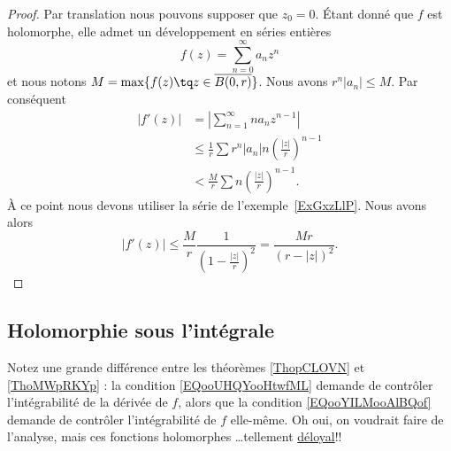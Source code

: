 \begin{proof}
	Par translation nous pouvons supposer que \( z_0=0\). Étant donné que \( f\) est holomorphe, elle admet un développement en séries entières
	\begin{equation}
		f(z)=\sum_{n=0}^{\infty}a_nz^n
	\end{equation}
	et nous notons \( M=\max\{ f(z)\tq z\in \overline{ B(0,r) } \}\). Nous avons \( r^n| a_n |\leq M\). Par conséquent
	\begin{subequations}
		\begin{align}
			| f'(z) | & =\left| \sum_{n=1}^{\infty}na_nz^{n-1} \right|                            \\
			          & \leq\frac{1}{ r }\sum r^n| a_n |n\left( \frac{ | z | }{ r } \right)^{n-1} \\
			          & <\frac{ M }{ r }\sum n\left( \frac{ | z | }{ r } \right)^{n-1}.
		\end{align}
	\end{subequations}
	À ce point nous devons utiliser la série de l'exemple~\ref{ExGxzLlP}. Nous avons alors
	\begin{equation}
		| f'(z) |\leq \frac{ M }{ r }\frac{ 1 }{ \left( 1-\frac{ | z | }{ r } \right)^2 }=\frac{ Mr }{ (r-| z |)^2 }.
	\end{equation}
\end{proof}

\subsection{Holomorphie sous l'intégrale}

\begin{normaltext}
	Notez une grande différence entre les théorèmes \ref{ThopCLOVN} et \ref{ThoMWpRKYp} : la condition \eqref{EQooUHQYooHtwfML} demande de contrôler l'intégrabilité de la dérivée de \( f\), alors que la condition \eqref{EQooYILMooAlBQof} demande de contrôler l'intégrabilité de \( f\) elle-même. Oh oui, on voudrait faire de l'analyse, mais ces fonctions holomorphes \ldots tellement  \href{https://www.dragonball-multiverse.com/fr/page-1835.html}{déloyal}!!
\end{normaltext}

